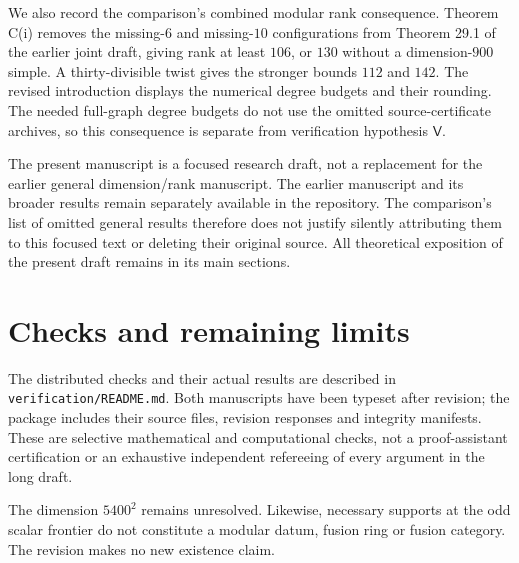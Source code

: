\documentclass[11pt,a4paper]{article}
\begin{document}
We also record the comparison's combined modular rank consequence.
Theorem C(i) removes the missing-$6$ and missing-$10$ configurations
from Theorem 29.1 of the earlier joint draft, giving rank at least
$106$, or $130$ without a dimension-$900$ simple. A thirty-divisible
twist gives the stronger bounds $112$ and $142$. The revised
introduction displays the numerical degree budgets and their rounding.
The needed full-graph degree budgets do not use the omitted
source-certificate archives, so this consequence is separate from
verification hypothesis $\mathsf V$.

The present manuscript is a focused research draft, not a replacement for
the earlier general dimension/rank manuscript. The earlier manuscript and
its broader results remain separately available in the repository. The
comparison's list of omitted general results therefore does not justify
silently attributing them to this focused text or deleting their original
source. All theoretical exposition of the present draft remains in its main
sections.

\section*{Checks and remaining limits}
The distributed checks and their actual results are described in
\texttt{verification/README.md}. Both manuscripts have been typeset after
revision; the package includes their source files, revision responses and
integrity manifests. These are selective mathematical and computational
checks, not a proof-assistant certification or an exhaustive independent
refereeing of every argument in the long draft.

The dimension $5400^2$ remains unresolved. Likewise, necessary supports at
the odd scalar frontier do not constitute a modular datum, fusion ring or
fusion category. The revision makes no new existence claim.
\end{document}
